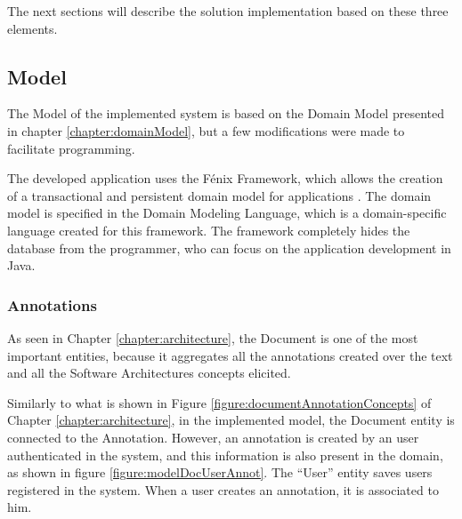 \documentclass{llncs}
\begin{document}
The next sections will describe the solution implementation based on these three elements.


\subsection{Model}
\label{section:model}
The Model of the implemented system is based on the Domain Model presented in chapter \ref{chapter:domainModel}, but a few modifications were made to facilitate programming.

The developed application uses the F\'{e}nix Framework, which allows the creation of a transactional and persistent domain model for applications \cite{cachopo2006combining,cachopo2007development}. The domain model is specified in the Domain Modeling Language, which is a domain-specific language created for this framework. The framework completely hides the database from the programmer, who can focus on the application development in Java. 

\subsubsection{Annotations}
\label{subsection:modelAnnotations}
As seen in Chapter \ref{chapter:architecture}, the Document is one of the most important entities, because it aggregates all the annotations created over the text and all the Software Architectures concepts elicited.

Similarly to what is shown in Figure \ref{figure:documentAnnotationConcepts} of Chapter \ref{chapter:architecture}, in the implemented model, the Document entity is connected to the Annotation. However, an annotation is created by an user authenticated in the system, and this information is also present in the domain, as shown in figure \ref{figure:modelDocUserAnnot}. The ``User'' entity saves users registered in the system. When a user creates an annotation, it is associated to him.
\end{document}
